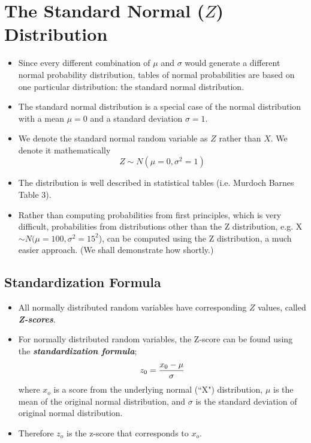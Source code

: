 \documentclass[a4paper,12pt]{article}
\begin{document}
\section*{The Standard Normal ($Z$) Distribution}

\begin{itemize}
\item Since every different combination of $\mu$ and $\sigma$ would generate a different normal
probability distribution, tables of normal probabilities are based on one
particular distribution: the standard normal distribution.  
	\item The standard normal distribution is a special case of the normal distribution with a mean $\mu= 0$ and a standard deviation $\sigma =1$.
	\item We denote the standard normal random variable as $Z$ rather than $X$. We denote it mathematically
	\[ Z \sim N(\mu=0,\sigma^2 = 1)\]
	
	\item The distribution is well described in statistical tables (i.e. Murdoch Barnes Table 3).
	\item Rather than computing probabilities from first principles, which is very difficult, probabilities from distributions other than the Z distribution, e.g. X $\sim N(\mu=100, \sigma^2 =15^2$), can be computed using the Z distribution, a much easier approach. (We shall demonstrate how shortly.)
\end{itemize}



\subsection*{Standardization Formula}
\begin{itemize}
\item All normally distributed random variables have corresponding $Z$ values, called \textbf{\emph{Z-scores}}.
\item 
For normally distributed random variables, the Z-score can be found using the \textbf{\emph{standardization formula}};
\[
z_{0} = {x_0 - \mu \over \sigma}
\]
where $x_o$ is a score from the underlying normal (``X") distribution, $\mu$ is the mean of the original normal distribution, and $\sigma$ is the standard deviation of original normal distribution.
\item 
Therefore $z_o$ is the z-score that corresponds to $x_o$.
\end{itemize}
\end{document}
